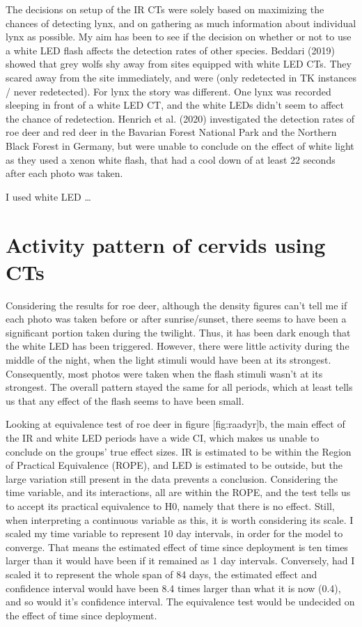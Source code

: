 The decisions on setup of the IR CTs were solely based on maximizing the chances of detecting lynx, and on gathering as much information about individual lynx as possible. My aim has been to see if the decision on whether or not to use a white LED flash affects the detection rates of other species. Beddari (2019) showed that grey wolfs shy away from sites equipped with white LED CTs. They scared away from the site immediately, and were (only redetected in TK instances / never redetected). For lynx the story was different. One lynx was recorded sleeping in front of a white LED CT, and the white LEDs didn’t seem to affect the chance of redetection. Henrich et al. (2020) investigated the detection rates of roe deer and red deer in the Bavarian Forest National Park and the Northern Black Forest in Germany, but were unable to conclude on the effect of white light as they used a xenon white flash, that had a cool down of at least 22 seconds after each photo was taken.

I used white LED …


\section{Activity pattern of cervids using CTs}

Considering the results for roe deer, although the density figures can’t tell me if each photo was taken before or after sunrise/sunset, there seems to have been a significant portion taken during the twilight. 
Thus, it has been dark enough that the white LED has been triggered.
However, there were little activity during the middle of the night, when the light stimuli would have been at its strongest. 
Consequently, most photos were taken when the flash stimuli wasn’t at its strongest. 
The overall pattern stayed the same for all periods, %
which at least tells us that any effect of the flash seems to have been small.

Looking at equivalence test of roe deer in figure [fig:raadyr]b, the main effect of the IR and white LED periods have a wide CI, which makes us unable to conclude on the groups’ true effect sizes. IR is estimated to be within the Region of Practical Equivalence (ROPE), and LED is estimated to be outside, but the large variation still present in the data prevents a conclusion.
Considering the time variable, and its interactions, all are within the ROPE, and the test tells us to accept its practical equivalence to H0, namely that there is no effect. Still, when interpreting a continuous variable as this, it is worth considering its scale. I scaled my time variable to represent 10 day intervals, in order for the model to converge. That means the estimated effect of time since deployment is ten times larger than it would have been if it remained as 1 day intervals. Conversely, had I scaled it to represent the whole span of 84 days, the estimated effect and confidence interval would have been 8.4 times larger than what it is now (0.4), and so would it’s confidence interval. The equivalence test would be undecided on the effect of time since deployment.


